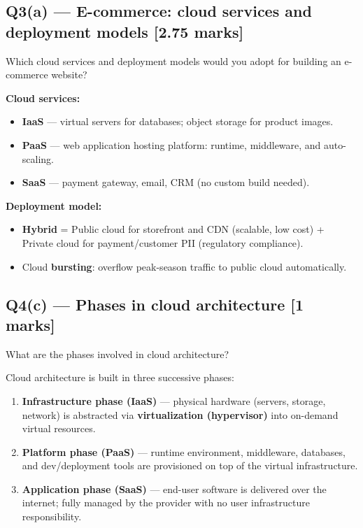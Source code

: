 \documentclass[12pt, a4paper]{article}
\newenvironment{qbox}{\begin{mdframed}[style=qframe]}{\end{mdframed}}
\newenvironment{solbox}{\begin{mdframed}[style=solframe]}{\end{mdframed}}
\newcommand{\qmarks}[1]{\hfill\textbf{\color{orange!70!black}[#1 marks]}}
\begin{document}
\subsection{Q3(a) --- E-commerce: cloud services and deployment models
  \texorpdfstring{\qmarks{2.75}}{}}
\begin{qbox}Which cloud services and deployment models would you adopt for building an
e-commerce website?\end{qbox}
\begin{solbox}
\textbf{Cloud services:}
\begin{itemize}[leftmargin=1.4cm, itemsep=1pt]
  \item \textbf{IaaS} --- virtual servers for databases; object storage for product images.
  \item \textbf{PaaS} --- web application hosting platform: runtime, middleware, and
    auto-scaling.
  \item \textbf{SaaS} --- payment gateway, email, CRM (no custom build needed).
\end{itemize}
\textbf{Deployment model:}
\begin{itemize}[leftmargin=1.4cm, itemsep=1pt]
  \item \textbf{Hybrid} = Public cloud for storefront and CDN (scalable, low cost) +
    Private cloud for payment/customer PII (regulatory compliance).
  \item Cloud \textbf{bursting}: overflow peak-season traffic to public cloud automatically.
\end{itemize}
\end{solbox}

\subsection{Q4(c) --- Phases in cloud architecture \texorpdfstring{\qmarks{1}}{}}
\begin{qbox}What are the phases involved in cloud architecture?\end{qbox}
\begin{solbox}
Cloud architecture is built in three successive phases:
\begin{enumerate}[leftmargin=1.6cm, itemsep=2pt]
  \item \textbf{Infrastructure phase (IaaS)} --- physical hardware (servers, storage, network)
    is abstracted via \textbf{virtualization (hypervisor)} into on-demand virtual resources.
  \item \textbf{Platform phase (PaaS)} --- runtime environment, middleware, databases, and
    dev/deployment tools are provisioned on top of the virtual infrastructure.
  \item \textbf{Application phase (SaaS)} --- end-user software is delivered over the internet;
    fully managed by the provider with no user infrastructure responsibility.
\end{enumerate}
\end{solbox}
\end{document}
